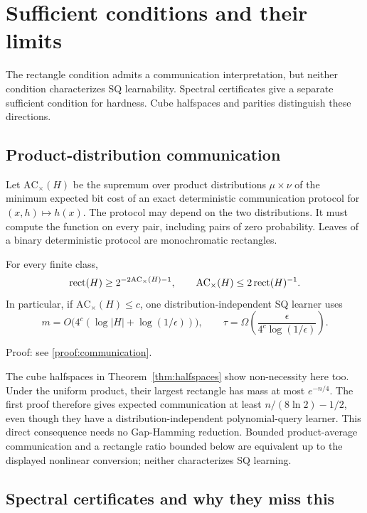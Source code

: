 \section{Sufficient conditions and their limits}\label{sec:characterizations}
The rectangle condition admits a communication interpretation, but neither condition characterizes SQ learnability. Spectral certificates give a separate sufficient condition for hardness. Cube halfspaces and parities distinguish these directions.
\subsection{Product-distribution communication}\label{sec:communication}
Let $\mathrm{AC}_{\times}(H)$ be the supremum over product distributions $\mu\times\nu$ of the minimum expected bit cost of an exact deterministic communication protocol for $(x,h)\mapsto h(x)$. The protocol may depend on the two distributions. It must compute the function on every pair, including pairs of zero probability. Leaves of a binary deterministic protocol are monochromatic rectangles.


\begin{theorem}\label{thm:communication}
For every finite class,
\[
 \operatorname{rect}(H)\ge2^{-2\mathrm{AC}_{\times}(H)-1},
 \qquad
 \mathrm{AC}_{\times}(H)\le2\operatorname{rect}(H)^{-1}.
\]
In particular, if $\mathrm{AC}_{\times}(H)\le c$, one distribution-independent SQ learner uses
\[
 m=O\bigl(4^c(\log|H|+\log(1/\epsilon))\bigr),\qquad
 \tau=\Omega\!\left(\frac{\epsilon}{4^c\log(1/\epsilon)}\right).
\]
\end{theorem}

\noindent Proof: see \cref{proof:communication}.\par


The cube halfspaces in Theorem~\ref{thm:halfspaces} show non-necessity here too. Under the uniform product, their largest rectangle has mass at most $e^{-n/4}$. The first proof therefore gives expected communication at least $n/(8\ln2)-1/2$, even though they have a distribution-independent polynomial-query learner. This direct consequence needs no Gap-Hamming reduction. Bounded product-average communication and a rectangle ratio bounded below are equivalent up to the displayed nonlinear conversion; neither characterizes SQ learning.

\subsection{Spectral certificates and why they miss this}\label{sec:retained}

